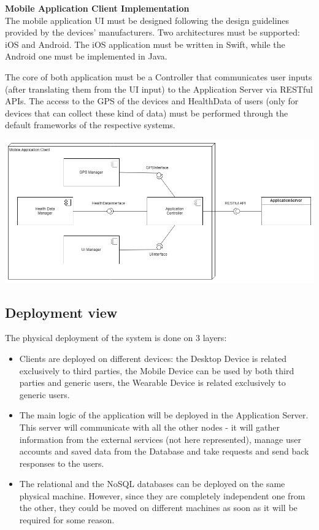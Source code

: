 \hspace{-\parindent}\textbf{Mobile Application Client Implementation}\\

The mobile application UI must be designed following the design guidelines provided by the devices’ manufacturers. Two architectures must be supported: iOS and Android. The iOS application must be written in Swift, while the Android one must be implemented in Java.

The core of both application must be a Controller that communicates user inputs (after translating them from the UI input) to the Application Server via RESTful APIs. The access to the GPS of the devices and HealthData of users (only for devices that can collect these kind of data) must be performed through the default frameworks of the respective systems.
\begin{center}
\includegraphics[scale=0.45]{sections/diagrams/mac.png}
\newline
{}
\end{center}

\subsection{Deployment view}
The physical deployment of the system is done on 3 layers:
\begin{itemize}
\item Clients are deployed on different devices: the Desktop Device is related exclusively to third parties, the Mobile Device can be used by both third parties and generic users, the Wearable Device is related exclusively to generic users.

\item  The main logic of the application will be deployed in the Application Server. This server will communicate with all the other nodes - it will gather information from the external services (not here represented), manage user accounts and saved data from the Database and take requests and send back responses to the users.

\item The relational and the NoSQL databases can be deployed on the same physical machine. However, since they are completely independent one from the other, they could be moved on different machines as soon as it will be required for some reason.
\end{itemize}

